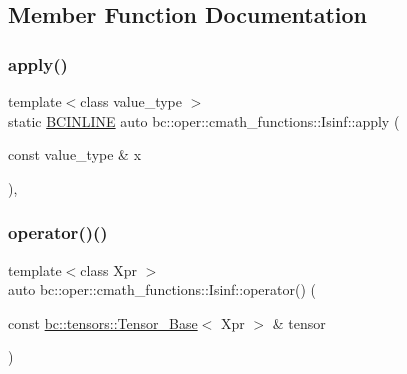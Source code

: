 \subsection{Member Function Documentation}
\mbox{\label{structbc_1_1oper_1_1cmath__functions_1_1Isinf_ae04f60545b7c574bea771a87b62757b6}} 
\subsubsection{\texorpdfstring{apply()}{apply()}}
{\footnotesize\ttfamily template$<$class value\+\_\+type $>$ \\
static \hyperlink{common_8h_a6699e8b0449da5c0fafb878e59c1d4b1}{B\+C\+I\+N\+L\+I\+NE} auto bc\+::oper\+::cmath\+\_\+functions\+::\+Isinf\+::apply (\begin{DoxyParamCaption}\item[{const value\+\_\+type \&}]{x }\end{DoxyParamCaption})\hspace{0.3cm}{\ttfamily [inline]}, {\ttfamily [static]}}

\mbox{\label{structbc_1_1oper_1_1cmath__functions_1_1Isinf_a8cb67e39763bf4baee5bca48cde09219}} 
\subsubsection{\texorpdfstring{operator()()}{operator()()}\hspace{0.1cm}{\footnotesize\ttfamily [1/3]}}
{\footnotesize\ttfamily template$<$class Xpr $>$ \\
auto bc\+::oper\+::cmath\+\_\+functions\+::\+Isinf\+::operator() (\begin{DoxyParamCaption}\item[{const \hyperlink{classbc_1_1tensors_1_1Tensor__Base}{bc\+::tensors\+::\+Tensor\+\_\+\+Base}$<$ Xpr $>$ \&}]{tensor }\end{DoxyParamCaption})\hspace{0.3cm}{\ttfamily [inline]}}

